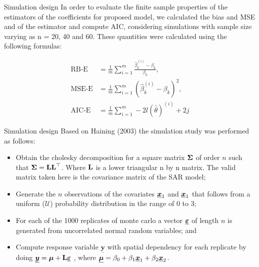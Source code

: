 \documentclass[10pt,unknownkeysallowed]{beamer}
\newcommand{\mat}[1]{\mbox{\boldmath{$#1$}}}
\begin{document}
\begin{frame}{Simulation design}
In order to evaluate the finite sample properties of the estimators of the coefficients  for proposed model,
 we calculated the bias and MSE and of the estimator and compute AIC,  considering simulations
with sample size varying as n = 20, 40 and 60. These quantities were calculated using the following formulas:

\begin{align*}
   \textrm{RB-E}&=\frac{1}{m}\sum_{i=1}^{m}\frac{\hat{\beta}_k^{(i)}-\beta_k}{\beta_k}, \nonumber \\
     \textrm{MSE-E}&= \frac{1}{m}\sum_{i=1}^{m}(\hat{\beta}_k^{(i)}-\beta_k)^2, \\
      \textrm{AIC-E}&=\frac{1}{m}\sum_{i=1}^{m}-2l(\hat{\theta})^{(i)}+2j
      \end{align*}




\end{frame}

\begin{frame}{Simulation design}
Based on Haining (2003) the simulation study was performed as follows:
 \begin{itemize}
    \item Obtain the cholesky decomposition for a square matrix $\mat{\Sigma}$ of order $n$ such that $\mat{\Sigma}= \textbf{\textrm{L}}\textbf{\textrm{L}}^\top$.  Where $\textbf{\textrm{L}}$ is a lower triangular n by n matrix. The valid matrix taken here is the covariance matrix of the SAR model;
    
    \item Generate the $n$ observations of the covariates  $\underline{\mat{x}}_1$ and $\underline{\mat{x}}_1$ that follows from a uniform ($\mathcal{U}$) probability distribution in the range of 0 to 3;

    \item  For each of the 1000 replicates of monte carlo a vector $\underline{\mat{\varepsilon}}$ of length $n$ is generated from uncorrelated normal random variables; and
    
    \item  Compute response variable $\underline{\mathbf{y}}$ with spatial dependency for each replicate by doing $\underline{\mat{y}}= \mat{\mu} + \textbf{\textrm{L}}\underline{\mat{\varepsilon}}$ , where $\underline{\mat{\mu}} = \beta_0 +\beta_1 \underline{\mat{x}}_1+\beta_2 \underline{\mat{x}}_2$.
    \end{itemize}
\end{frame}
\end{document}
